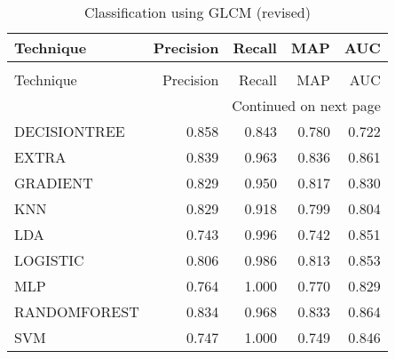 \begin{longtable}{lrrrr}
\caption[Classification using GLCM (revised)]{Classification using GLCM (revised)}
\label{table:glcm-auc}\\
\toprule
   Technique &  Precision &  Recall &   MAP &   AUC \\
\midrule
\endfirsthead
\caption[]{Classification using GLCM (revised)} \\
\toprule
   Technique &  Precision &  Recall &   MAP &   AUC \\
\midrule
\endhead
\midrule
\multicolumn{5}{r}{{Continued on next page}} \\
\midrule
\endfoot

\bottomrule
\endlastfoot
DECISIONTREE &      0.858 &   0.843 & 0.780 & 0.722 \\
       EXTRA &      0.839 &   0.963 & 0.836 & 0.861 \\
    GRADIENT &      0.829 &   0.950 & 0.817 & 0.830 \\
         KNN &      0.829 &   0.918 & 0.799 & 0.804 \\
         LDA &      0.743 &   0.996 & 0.742 & 0.851 \\
    LOGISTIC &      0.806 &   0.986 & 0.813 & 0.853 \\
         MLP &      0.764 &   1.000 & 0.770 & 0.829 \\
RANDOMFOREST &      0.834 &   0.968 & 0.833 & 0.864 \\
         SVM &      0.747 &   1.000 & 0.749 & 0.846 \\
\end{longtable}
